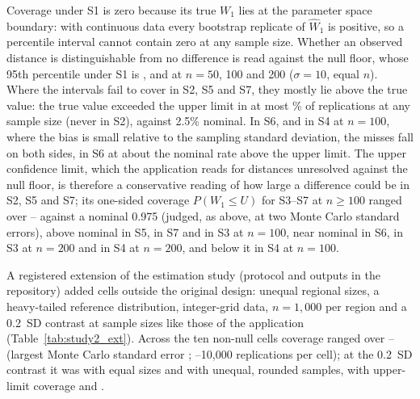 \documentclass[AMA,Times1COL]{WileyNJDv5}
\begin{document}
Coverage under S1 is zero because its true $W_1$ lies at the parameter space boundary: with continuous data every bootstrap replicate of $\widehat{W}_1$ is positive, so a percentile interval cannot contain zero at any sample size. Whether an observed distance is distinguishable from no difference is read against the null floor, whose 95th percentile under S1 is ,  and  at $n = 50$, 100 and 200 ($\sigma = 10$, equal $n$). Where the intervals fail to cover in S2, S5 and S7, they mostly lie above the true value: the true value exceeded the upper limit in at most \% of replications at any sample size (never in S2), against 2.5\% nominal. In S6, and in S4 at $n = 100$, where the bias is small relative to the sampling standard deviation, the misses fall on both sides, in S6 at about the nominal rate above the upper limit. The upper confidence limit, which the application reads for distances unresolved against the null floor, is therefore a conservative reading of how large a difference could be in S2, S5 and S7; its one-sided coverage $P(W_1 \leq U)$ for S3--S7 at $n \geq 100$ ranged over -- against a nominal 0.975 (judged, as above, at two Monte Carlo standard errors), above nominal in S5, in S7 and in S3 at $n = 100$, near nominal in S6, in S3 at $n = 200$ and in S4 at $n = 200$, and below it in S4 at $n = 100$.



A registered extension of the estimation study (protocol and outputs in the repository) added cells outside the original design: unequal regional sizes, a heavy-tailed reference distribution, integer-grid data, $n = 1{,}000$ per region and a 0.2~SD contrast at sample sizes like those of the application (Table~\ref{tab:study2_ext}). Across the ten non-null cells coverage ranged over -- (largest Monte Carlo standard error ; --10{,}000 replications per cell); at the 0.2~SD contrast it was  with equal sizes and  with unequal, rounded samples, with upper-limit coverage  and .
\end{document}

